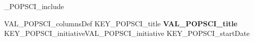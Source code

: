 %
\ifVAL_POPSCI_include %
\begin{myTableEnv}{VAL_POPSCI_columnsDef}
    \myRow
        {KEY_POPSCI_title}
        {\bfseries VAL_POPSCI_title}
        {KEY_POPSCI_initiative}{VAL_POPSCI_initiative}
    \myRow
        {KEY_POPSCI_startDate}{}
        {}{}
\end{myTableEnv}
%
\fi
%